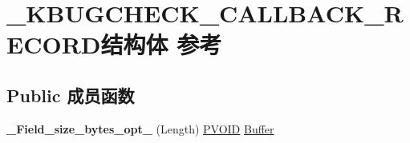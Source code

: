 \hypertarget{struct___k_b_u_g_c_h_e_c_k___c_a_l_l_b_a_c_k___r_e_c_o_r_d}{}\section{\+\_\+\+K\+B\+U\+G\+C\+H\+E\+C\+K\+\_\+\+C\+A\+L\+L\+B\+A\+C\+K\+\_\+\+R\+E\+C\+O\+R\+D结构体 参考}
\label{struct___k_b_u_g_c_h_e_c_k___c_a_l_l_b_a_c_k___r_e_c_o_r_d}
\subsection*{Public 成员函数}
\begin{DoxyCompactItemize}
\item 
\mbox{\label{struct___k_b_u_g_c_h_e_c_k___c_a_l_l_b_a_c_k___r_e_c_o_r_d_ad72d6276d6ff6cfde64aed46a52dd315}} 
{\bfseries \+\_\+\+Field\+\_\+size\+\_\+bytes\+\_\+opt\+\_\+} (Length) \hyperlink{interfacevoid}{P\+V\+O\+ID} \hyperlink{class_buffer}{Buffer}
\end{DoxyCompactItemize}
